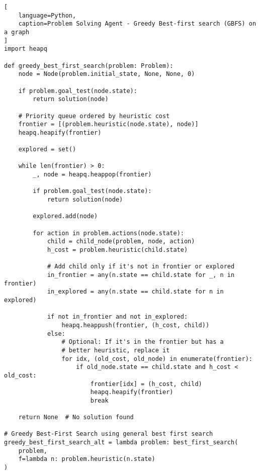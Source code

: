 \begin{lstlisting}[
    language=Python,
    caption=Problem Solving Agent - Greedy Best-first search (GBFS) on a graph
]
import heapq

def greedy_best_first_search(problem: Problem):
    node = Node(problem.initial_state, None, None, 0)

    if problem.goal_test(node.state):
        return solution(node)

    # Priority queue ordered by heuristic cost
    frontier = [(problem.heuristic(node.state), node)]
    heapq.heapify(frontier)

    explored = set()

    while len(frontier) > 0:
        _, node = heapq.heappop(frontier)

        if problem.goal_test(node.state):
            return solution(node)

        explored.add(node)

        for action in problem.actions(node.state):
            child = child_node(problem, node, action)
            h_cost = problem.heuristic(child.state)

            # Add child only if it's not in frontier or explored
            in_frontier = any(n.state == child.state for _, n in frontier)
            in_explored = any(n.state == child.state for n in explored)

            if not in_frontier and not in_explored:
                heapq.heappush(frontier, (h_cost, child))
            else:
                # Optional: If it's in the frontier but has a 
                # better heuristic, replace it
                for idx, (old_cost, old_node) in enumerate(frontier):
                    if old_node.state == child.state and h_cost < old_cost:
                        frontier[idx] = (h_cost, child)
                        heapq.heapify(frontier)
                        break

    return None  # No solution found

# Greedy Best-First Search using general best first search
greedy_best_first_search_alt = lambda problem: best_first_search(
    problem, 
    f=lambda n: problem.heuristic(n.state)
)
\end{lstlisting}










